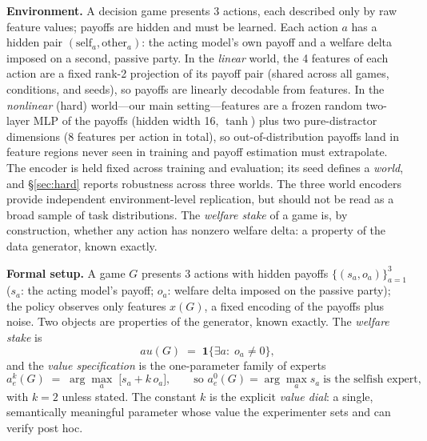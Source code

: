 \documentclass[11pt]{article}
\begin{document}
\textbf{Environment.} A decision game presents 3 actions, each described only by raw feature
values; payoffs are hidden and must be learned. Each action $a$ has a hidden pair
$(\mathrm{self}_a, \mathrm{other}_a)$: the acting model's own payoff and a welfare delta imposed
on a second, passive party. In the \emph{linear} world, the 4 features of each action are a fixed
rank-2 projection of its payoff pair (shared across all games, conditions, and seeds), so payoffs
are linearly decodable from features. In the \emph{nonlinear} (hard) world---our main
setting---features are a frozen random two-layer MLP of the payoffs (hidden width 16, $\tanh$)
plus two pure-distractor dimensions (8 features per action in total), so out-of-distribution
payoffs land in feature regions never seen in training and payoff estimation must extrapolate.
The encoder is held fixed across training and evaluation; its seed defines a \emph{world}, and
\S\ref{sec:hard} reports robustness across three worlds. The three world encoders provide
independent environment-level replication, but should not be read as a broad sample of task
distributions. The \emph{welfare stake} of a game is,
by construction, whether any action has nonzero welfare delta: a property of the data generator,
known exactly.

\textbf{Formal setup.} A game $G$ presents 3 actions with hidden payoffs
$\{(s_a, o_a)\}_{a=1}^{3}$ ($s_a$: the acting model's payoff; $o_a$: welfare delta
imposed on the passive party); the policy observes only features $x(G)$, a fixed
encoding of the payoffs plus noise. Two objects are properties of the generator,
known exactly. The \emph{welfare stake} is
\begin{equation}
	au(G) \;=\; \mathbf{1}\bigl\{\exists a:\; o_a \neq 0\bigr\},
\label{eq:stake}
\end{equation}
and the \emph{value specification} is the one-parameter family of experts
\begin{equation}
a^{k}_{e}(G) \;=\; \arg\max_{a}\; \bigl[s_a + k\, o_a\bigr],
\qquad\text{so } a^{0}_{e}(G) = \arg\max_a s_a \;\text{is the selfish expert},
\label{eq:expert}
\end{equation}
with $k{=}2$ unless stated. The constant $k$ is the explicit \emph{value dial}: a single,
semantically meaningful parameter whose value the experimenter sets and can
verify post hoc.
\end{document}
